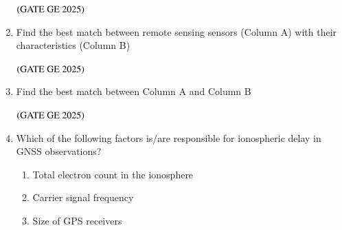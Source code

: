 \documentclass[journal,12pt,onecolumn]{IEEEtran}
\theoremstyle{remark}
\begin{document}
\begin{enumerate}
\begin{figure}[H]
    \label{figs:fig7}
\end{figure}
\begin{enumerate}
\end{enumerate}
\hfill $\left(\text{GATE GE 2025}\right)$
\bigskip
\item Find the best match between remote sensing sensors (Column A) with their characteristics (Column B)
\begin{table}[h]
    \centering
    
\end{table}
\begin{enumerate}
\end{enumerate}
\hfill $\left(\text{GATE GE 2025}\right)$
\bigskip
\item Find the best match between Column A and Column B
\begin{table}[h]
    \centering
    
\end{table}
\begin{enumerate}
\end{enumerate}
\hfill $\left(\text{GATE GE 2025}\right)$
\bigskip
\item Which of the following factors is/are responsible for ionospheric delay in GNSS observations?
\begin{enumerate}
\item Total electron count in the ionosphere
\item Carrier signal frequency
\item Size of GPS receivers

\end{enumerate}
\end{enumerate}
\end{document}
